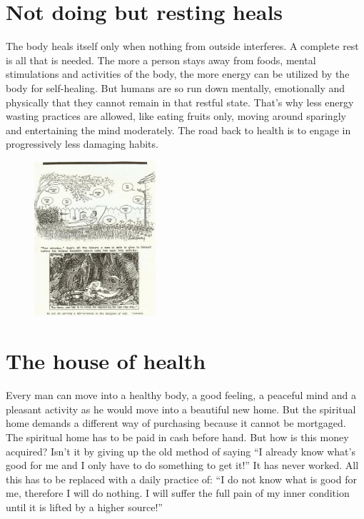 \documentclass[landscape,twocolumn,letterpaper]{article}
\begin{document}
\section{Not doing but resting heals}
\label{sec:ndbrh}

The body heals itself only when nothing from outside interferes. A
complete rest is all that is needed. The more a person stays away from
foods, mental stimulations and activities of the body, the more energy
can be utilized by the body for self-healing. But humans are so run
down mentally, emotionally and physically that they cannot remain in
that restful state. That's why less energy wasting practices are
allowed, like eating fruits only, moving around sparingly and
entertaining the mind moderately. The road back to health is to engage
in progressively less damaging habits.

\begin{figure} \centering
  \includegraphics[width=0.4\textwidth,bb= 0 0 476 608]{p28.jpg}
\end{figure}
\section{The house of health}
\label{sec:thoh}

Every man can move into a healthy body, a good feeling, a peaceful
mind and a pleasant activity as he would move into a beautiful new
home. But the spiritual home demands a different way of purchasing
because it cannot be mortgaged. The spiritual home has to be paid in
cash before hand. But how is this money acquired? Isn't it by giving
up the old method of saying ``I already know what's good for me and I
only have to do something to get it!'' It has never worked. All this
has to be replaced with a daily practice of: ``I do not know what is
good for me, therefore I will do nothing. I will suffer the full pain
of my inner condition until it is lifted by a higher source!''
\end{document}
